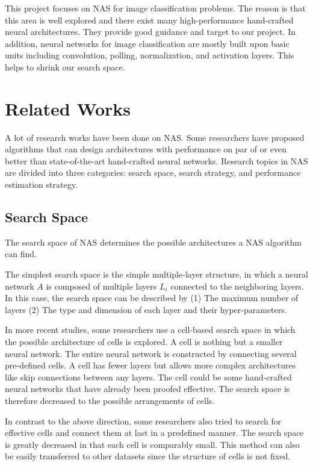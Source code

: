\documentclass[conference]{IEEEtran}
\begin{document}
    This project focuses on NAS for image classification problems. The reason is that this area is well explored and there exist many high-performance hand-crafted neural architectures. They provide good guidance and target to our project. In addition, neural networks for image classification are mostly built upon basic units including convolution, polling, normalization, and activation layers. This helps to shrink our search space.
  


  \section{Related Works}
  A lot of research works have been done on NAS. Some researchers have proposed algorithms that can design architectures with performance on par of or even better than state-of-the-art hand-crafted neural networks. Research topics in NAS are divided into three categories: search space, search strategy, and performance estimation strategy.
  
  \subsection{Search Space}
  
  The search space of NAS determines the possible architectures a NAS algorithm can find.

  The simplest search space is the simple multiple-layer structure, in which a neural network $A$ is composed of multiple layers $L_i$ connected to the neighboring layers. In this case, the search space can be described by (1) The maximum number of layers (2) The type and dimension of each layer and their hyper-parameters\cite{chollet2017xception}\cite{baker2016designing}. 

  In more recent studies, some researchers use a cell-based search space in which the possible architecture of cells is explored. A cell is nothing but a smaller neural network. The entire neural network is constructed by connecting several pre-defined cells. A cell has fewer layers but allows more complex architectures like skip connections between any layers\cite{cai2018path}\cite{real2018regularized}. The cell could be some hand-crafted neural networks that have already been proofed effective. The search space is therefore decreased to the possible arrangements of cells.

  In contrast to the above direction, some researchers also tried to search for effective cells and connect them at last in a predefined manner\cite{zoph2018learning}\cite{cai2018path}. The search space is greatly decreased in that each cell is comparably small. This method can also be easily transferred to other datasets\cite{zoph2018learning} since the structure of cells is not fixed.
\end{document}
